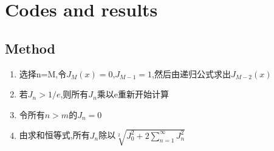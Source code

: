 \documentclass[9pt,a4paper,twoside]{tau-class/tau}
\begin{document}
\section{Codes and results}
\subsection{Method}
\begin{enumerate}
	\item 选择n=M,令$J_{M}(x)=0$,$J_{M-1}=1$,然后由递归公式求出$J_{M-2}(x)$
	\item 若$J_{n}>1/e$,则所有$J_{n}$乘以e重新开始计算
	\item 令所有$n>m$的$J_{n}=0$
	\item 由求和恒等式,所有$J_{n}$除以$\sqrt[2]{J_{0}^2+2\sum_{n=1}^{\infty}J_{n}^2}$
\end{enumerate}

\end{document}
